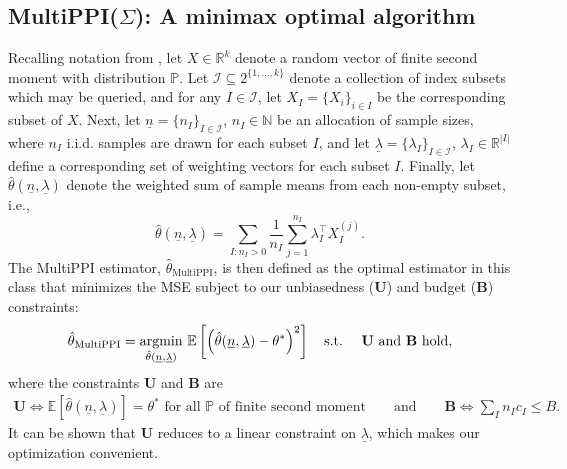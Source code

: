 \documentclass{article} %
\newcommand{\p}{\mathbb{P}}
\newcommand{\R}{\mathbb{R}}
\newcommand{\Ex}{\mathbb{E}}
\newcommand{\ul}[1]{\underline{#1}}
\DeclareMathOperator{\argmin}{argmin}
\begin{document}



\subsection{MultiPPI($\Sigma$): A minimax optimal algorithm}
Recalling notation from , let $X\in\R^k$ denote a random vector of finite second moment with distribution $\p$. Let $\mathcal{I} \subseteq 2^{\{1, \ldots, k\}}$ denote a collection of index subsets which may be queried, and for any $I \in \mathcal{I}$, let  $X_I = \{X_i\}_{i \in I}$ be the corresponding subset of $X$. Next, let $\underline{n} = \{n_I\}_{I \in \mathcal{I}}$, $n_I \in \mathbb{N}$ be an allocation of sample sizes, where $n_I$ i.i.d. samples are drawn for each subset $I$, and let $\underline{\lambda} = \{\lambda_I\}_{I \in \mathcal{I}}$, $\lambda_I \in \mathbb{R}^{|I|}$ define a corresponding set of weighting vectors for each subset  $I$. Finally, let $\hat{\theta}(\underline{n}, \underline{\lambda})$ denote the weighted sum of sample means from each non-empty subset, i.e.,
\begin{equation}\label{eq:theta-n-lambda}
    \hat{\theta}(\underline{n}, \underline{\lambda}) = \sum_{I:n_I>0} \frac{1}{n_I}\sum_{j=1}^{n_I} \lambda_I^\top X_I^{(j)}.
\end{equation}
The MultiPPI estimator, $\hat{\theta}_{\text{MultiPPI}}$, is then defined as the optimal estimator in this class that minimizes the MSE subject to our unbiasedness (\textbf{U}) and budget (\textbf{B}) constraints:
\begin{equation}
\label{eq:multippi_opt}
    \hat{\theta}_{\text{MultiPPI}} = \underset{\hat{\theta}(\underline{n}, \underline{\lambda})}{\argmin} ~\Ex\left[\Big(\hat{\theta}(\underline{n}, \underline{\lambda}) - \theta^*\Big)^2\right] \quad \text{s.t.} \quad \text{
    \textbf{U} and \textbf{B} hold}, 
\end{equation}
where the constraints \textbf{U}  and \textbf{B} are
\begin{align*}
    \textbf{U}\iff \Ex[ \hat{\theta}(\ul{n},\ul{\lambda})] = \theta^*\text{ for all $\p$ of finite second moment} \quad\quad\text{and} \quad\quad \textbf{B}\iff\sum_{I}n_Ic_I\leq B.
\end{align*}
It can be shown that \textbf{U} reduces to a linear constraint on $\ul{\lambda}$, which makes our optimization convenient.
\end{document}
